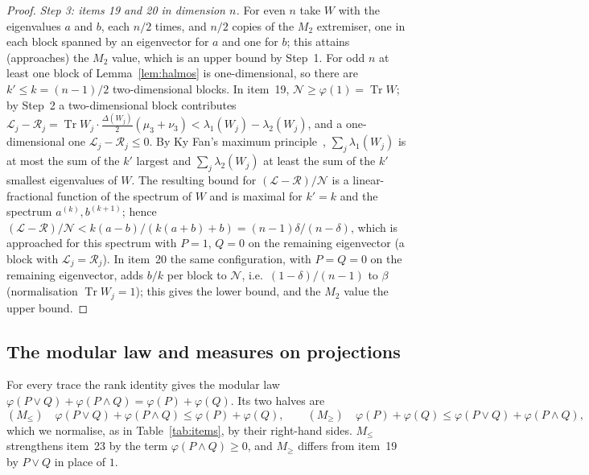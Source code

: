 \documentclass[11pt]{article}
\DeclareMathOperator{\Tr}{Tr}
\newcommand{\cL}{\mathcal{L}}
\newcommand{\cR}{\mathcal{R}}
\newcommand{\cN}{\mathcal{N}}
\theoremstyle{plain}
\theoremstyle{definition}
\theoremstyle{remark}
\begin{document}
\begin{proof}
\emph{Step 3: items 19 and 20 in dimension $n$.} For even $n$ take $W$ with the eigenvalues $a$ and $b$, each $n/2$
times, and $n/2$ copies of the $M_2$ extremiser, one in each block spanned by an eigenvector for $a$ and one for $b$;
this attains (approaches) the $M_2$ value, which is an upper bound by Step~1. For odd $n$ at least one block of
Lemma~\ref{lem:halmos} is one-dimensional, so there are $k'\le k=(n-1)/2$ two-dimensional blocks. In item~19,
$\cN\ge\varphi(1)=\Tr W$; by Step~2 a two-dimensional block contributes $\cL_j-\cR_j=\Tr W_j\cdot\frac{\Delta(W_j)}2(\mu_3+\nu_3)
<\lambda_1(W_j)-\lambda_2(W_j)$, and a one-dimensional one $\cL_j-\cR_j\le0$. By Ky Fan's maximum
principle~\cite[Sect.~III.1]{bhatia1997}, $\sum_j\lambda_1(W_j)$ is at most the sum of the $k'$ largest and
$\sum_j\lambda_2(W_j)$ at least the sum of the $k'$ smallest eigenvalues of $W$. The resulting bound for $(\cL-\cR)/\cN$ is a
linear-fractional function of the spectrum of $W$ and is maximal for $k'=k$ and the spectrum $a^{(k)},b^{(k+1)}$; hence
$(\cL-\cR)/\cN<k(a-b)/(k(a+b)+b)=(n-1)\delta/(n-\delta)$, which is approached for this spectrum with $P=1$, $Q=0$ on the remaining
eigenvector (a block with $\cL_j=\cR_j$). In item~20 the same configuration, with $P=Q=0$ on the remaining eigenvector, adds $b/k$ per block
to $\cN$, i.e.\ $(1-\delta)/(n-1)$ to $\beta$ (normalisation $\Tr W_j=1$); this gives the lower bound, and the $M_2$ value
the upper bound.
\end{proof}

\subsection{The modular law and measures on projections}\label{sec:measures}

For every trace the rank identity gives the modular law $\varphi(P\vee Q)+\varphi(P\wedge Q)=\varphi(P)+\varphi(Q)$. Its two
halves are
\[
  (M_\le)\quad\varphi(P\vee Q)+\varphi(P\wedge Q)\le\varphi(P)+\varphi(Q),\qquad
  (M_\ge)\quad\varphi(P)+\varphi(Q)\le\varphi(P\vee Q)+\varphi(P\wedge Q),
\]
which we normalise, as in Table~\ref{tab:items}, by their right-hand sides. $M_\le$ strengthens item~23 by the term
$\varphi(P\wedge Q)\ge0$, and $M_\ge$ differs from item~19 by $P\vee Q$ in place of $1$.
\end{document}

